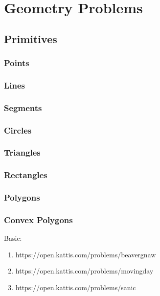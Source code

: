 \section{Geometry Problems}

\subsection{Primitives}
\subsubsection{Points}
\subsubsection{Lines}
\subsubsection{Segments}
\subsubsection{Circles}
\subsubsection{Triangles}
\subsubsection{Rectangles}
\subsubsection{Polygons}
\subsubsection{Convex Polygons}

\hrulefill

Basic:
\begin{enumerate}
\item https://open.kattis.com/problems/beavergnaw
\item https://open.kattis.com/problems/movingday
\item https://open.kattis.com/problems/sanic
\end{enumerate}
